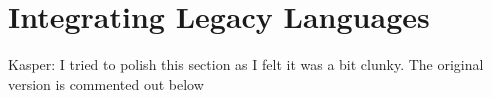 \documentclass[conference]{IEEEtran}
\newcommand{\martin}[1]{{\color{blue} Martin: #1}}
\newcommand{\simon}[1]{{\color{green} Simon: #1}}
\newcommand{\kasper}[1]{{\color{purple} Kasper: #1}}
\begin{document}
\section{Integrating Legacy Languages}
\kasper{I tried to polish this section as I felt it was a bit clunky. The original version is commented out below}

\end{document}
